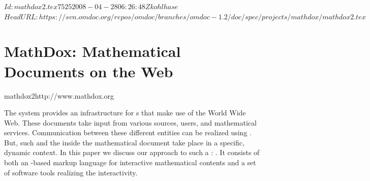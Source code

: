 \svnInfo $Id: mathdox2.tex 7525 2008-04-28 06:26:48Z kohlhase $
\svnKeyword $HeadURL: https://svn.omdoc.org/repos/omdoc/branches/omdoc-1.2/doc/spec/projects/mathdox/mathdox2.tex $

\section[MathDox]{MathDox: Mathematical Documents on the Web}
\begin{project}{mathdox2}{http://www.mathdox.org}
\end{project}
\renewcommand{\CAS}{\indextoo{CAS}}


\begin{pabstract}
  The {\MathDox} system provides an infrastructure for
  {s} that make use of the World Wide Web.
  These documents take input from various sources, users, and mathematical services.
  Communication between these different entities can be realized using {\openmath}.  But,
  such {} and the {} inside the
  mathematical document take place in a specific, dynamic context. In this paper we
  discuss our approach to such a {}: {\MathDox}.
  It consists of both an {\xml}-based markup language for interactive mathematical
  contents and a set of software tools realizing the interactivity.
\end{pabstract}



